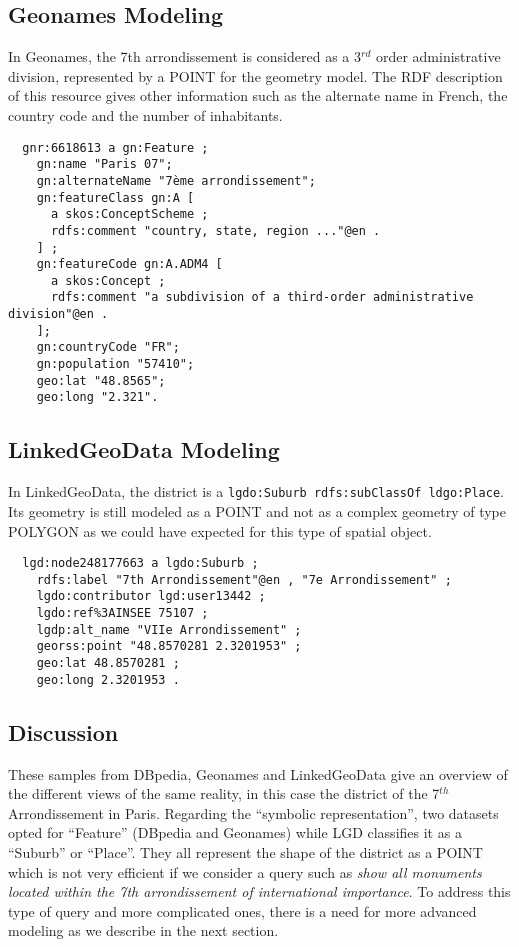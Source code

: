 \subsection{Geonames Modeling}
In Geonames, the 7th arrondissement is considered as a 3$^{rd}$ order administrative division, represented by a POINT for the geometry model. The RDF description of this resource gives other information such as the alternate name in French, the country code and the number of inhabitants.
{\scriptsize
\begin{verbatim}
  gnr:6618613 a gn:Feature ;
    gn:name "Paris 07";
    gn:alternateName "7ème arrondissement";
    gn:featureClass gn:A [
      a skos:ConceptScheme ;
      rdfs:comment "country, state, region ..."@en .
    ] ;
    gn:featureCode gn:A.ADM4 [
      a skos:Concept ;
      rdfs:comment "a subdivision of a third-order administrative division"@en .
    ];
    gn:countryCode "FR";
    gn:population "57410";
    geo:lat "48.8565";
    geo:long "2.321".
\end{verbatim}
}

\subsection{LinkedGeoData Modeling}
In LinkedGeoData, the district is a \texttt{lgdo:Suburb rdfs:subClassOf ldgo:Place}. Its geometry is still modeled as a POINT and not as a complex geometry of type POLYGON as we could have expected for this type of spatial object.
{\scriptsize
\begin{verbatim}
  lgd:node248177663 a lgdo:Suburb ;
    rdfs:label "7th Arrondissement"@en , "7e Arrondissement" ;
    lgdo:contributor lgd:user13442 ;
    lgdo:ref%3AINSEE 75107 ;
    lgdp:alt_name "VIIe Arrondissement" ;
    georss:point "48.8570281 2.3201953" ;
    geo:lat 48.8570281 ;
    geo:long 2.3201953 .
\end{verbatim}
}

\subsection{Discussion}
These samples from DBpedia, Geonames and LinkedGeoData give an overview of the different views of the same reality, in this case the district of the 7$^{th}$ Arrondissement in Paris. Regarding the ``symbolic representation'', two datasets opted for ``Feature'' (DBpedia and Geonames) while LGD classifies it as a ``Suburb'' or ``Place''. They all represent the shape of the district as a POINT which is not very efficient if we consider a query such as \emph{show all monuments located within the 7th arrondissement of international importance}. To address this type of query and more complicated ones, there is a need for more advanced modeling as we describe in the next section.

